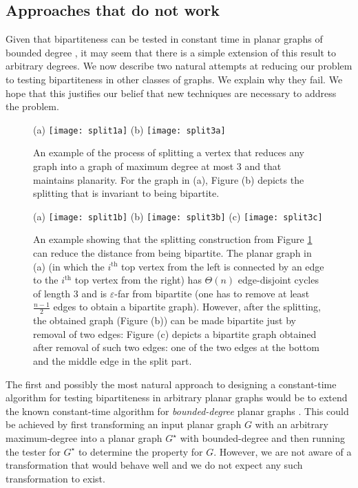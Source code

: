\documentclass[11pt]{article}
\newcommand{\eps}{\ensuremath{\epsilon}}
\def\epsilon{\ensuremath{\varepsilon}}
\begin{document}
\subsection{Approaches that do not work}

Given that bipartiteness can be tested in constant time in planar graphs of bounded degree \cite{CSS09}, it may seem that there is a simple extension of this result to arbitrary degrees. We now describe two natural attempts at reducing our problem to testing bipartiteness in other classes of graphs. We explain why they fail. We hope that this justifies our belief that new techniques are necessary to address the problem.



\begin{figure}[t]
\centerline{
(a)
\texttt{[image: split1a]}
        \qquad\quad
(b)
\texttt{[image: split3a]}
}
\caption{An example of the process of splitting a vertex that reduces any graph into a graph of maximum degree at most $3$ and that maintains planarity. For the graph in (a), Figure (b) depicts the splitting that is invariant to being bipartite.}
\label{fig:splitting-to-deg-3}
\end{figure}

\begin{figure}[t]
\centerline{
(a)
\texttt{[image: split1b]}
        \qquad\quad
(b)
\texttt{[image: split3b]}
        \qquad\quad
(c)
\texttt{[image: split3c]}
}
\caption{An example showing that the splitting construction from Figure \ref{fig:splitting-to-deg-3} can reduce the distance from being bipartite. The planar graph in (a) (in which the $i^{\text{th}}$ top vertex from the left is connected by an edge to the $i^{\text{th}}$ top vertex from the right) has $\Theta(n)$ edge-disjoint cycles of length $3$ and is $\eps$-far from bipartite (one has to remove at least $\frac{n-1}{2}$ edges to obtain a bipartite graph). However, after the splitting, the obtained graph (Figure (b)) can be made bipartite just by removal of two edges: Figure (c) depicts a bipartite graph obtained after removal of such two edges: one of the two edges at the bottom and the middle edge in the split part.}
\label{fig:splitting-to-deg-3-with-far}
\end{figure}



The first and possibly the most natural approach to designing a constant-time algorithm for testing bipartiteness in arbitrary planar graphs would be to extend the known constant-time algorithm for \emph{bounded-degree} planar graphs \cite{CSS09}. This could be achieved by first transforming an input planar graph $G$ with an arbitrary maximum-degree into a planar graph $G^\star$ with bounded-degree and then running the tester for $G^\star$ to determine the property for $G$. However, we are not aware of a transformation that would behave well and we do not expect any such transformation to exist.
\end{document}
